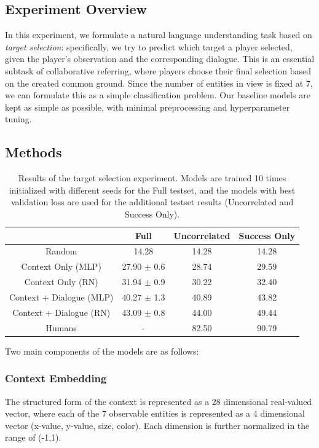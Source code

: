 \documentclass[letterpaper]{article}
\begin{document}
\subsection{Experiment Overview}

In this experiment, we formulate a natural language understanding task based on \textit{target selection}: specifically, we try to predict which target a player selected, given the player's observation and the corresponding dialogue. This is an essential subtask of collaborative referring, where players choose their final selection based on the created common ground. Since the number of entities in view is fixed at 7, we can formulate this as a simple classification problem. Our baseline models are kept as simple as possible, with minimal preprocessing and hyperparameter tuning.

\subsection{Methods}

\begin{table}[htb!]
\centering \small
\begin{adjustbox}{width=0.43\columnwidth}
\begin{tabular}{c|ccc}
\toprule
& Full & Uncorrelated & Success Only \\
\midrule
Random & 14.28 & 14.28 & 14.28 \\
\midrule
Context Only (MLP) & 27.90 $\pm$ 0.6 & 28.74 & 29.59 \\
Context Only (RN) & 31.94 $\pm$ 0.9 & 30.22 & 32.40 \\
Context + Dialogue (MLP) & 40.27 $\pm$ 1.3 & 40.89 & 43.82 \\
Context + Dialogue (RN) & 43.09 $\pm$ 0.8 & 44.00 & 49.44 \\
\midrule
Humans & - & 82.50 & 90.79 \\
\bottomrule
\end{tabular}
\end{adjustbox}
\caption{\label{selection_experiment}
Results of the target selection experiment. Models are trained 10 times initialized with different seeds for the Full testset, and the models with best validation loss are used for the additional testset results (Uncorrelated and Success Only).
}
\end{table}

Two main components of the models are as follows:

\subsubsection{Context Embedding}
The structured form of the context is represented as a 28 dimensional real-valued vector, where each of the 7 observable entities is represented as a 4 dimensional vector (x-value, y-value, size, color). Each dimension is further normalized in the range of (-1,1).
\end{document}
